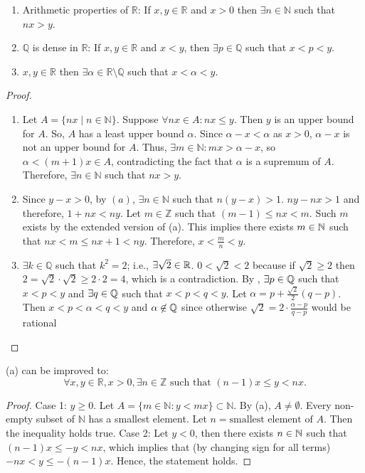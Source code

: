 \begin{theorem}
	\hfill
	\begin{enumerate}[label=(\alph*)]
		\item Arithmetic properties of $\mathbb{R}$:
		      If $x,y \in \mathbb{R}$ and  $x>0$ then $\exists n\in \mathbb{N}$ such that $nx>y$.
		\item $\mathbb{Q}$ is dense in $\mathbb{R}$: If $x,y \in \mathbb{R}$ and $x<y$, then $\exists p \in \mathbb{Q}$ such that $x<p<y$.
		\item $x, y \in \mathbb{R}$ then $\exists \alpha \in \mathbb{R}\setminus \mathbb{Q}$ such that $x<\alpha<y$.
	\end{enumerate}
	\begin{proof}
		\def\currentprefix{arithmetic}
		\begin{enumerate}[label=(\alph*)]
			\item {} Let $A = \{nx \mid n \in \mathbb{N}\}$. Suppose $\forall nx \in A: nx \leq y$. Then $y$ is an upper bound for $A$. So, $A$ has a least upper bound $\alpha$. Since $\alpha - x < \alpha$ as $x>0$, $\alpha -x$  is not an upper bound for $A$. Thus, $\exists m\in \mathbb{N}: mx>\alpha-x$, so $\alpha<(m+1)x\in A$, contradicting the fact that $\alpha$ is a supremum of $A$. Therefore, $\exists n\in \mathbb{N}$ such that $nx>y$.
			\item {}  Since $y-x>0$, by $(a)$, $\exists n\in \mathbb{N}$ such that $n(y-x)>1$. $ny-nx>1$ and therefore, $1+nx<ny$.
			      Let $m\in \mathbb{Z}$ such that $(m-1)\le nx<m$. Such $m$ exists by the extended version of (a).
			      This implies there exists $m \in \mathbb{N} $ such that  $nx<m\le nx+1<ny$. Therefore, $x<\frac{m}{n}<y$.
			\item {} $\exists k\in \mathbb{Q}$ such that $k^2=2$; i.e., $\exists{\sqrt{2} \in \ensuremath{\mathbb{R}}}$.
			      $0<\sqrt{2}<2$ because if $\sqrt{2}\ge 2$ then $2=\sqrt{2}\cdot \sqrt{2}\ge 2\cdot 2= 4$, which is a contradiction.
			      By , $\exists p\in \mathbb{Q} $ such that $x<p<y$ and $\exists q \in \mathbb{Q} $ such that $x<p<q<y$. Let $\alpha=p+\frac{\sqrt{2}}{2}(q-p)$. Then $x<p<\alpha<q<y$ and $\alpha \not\in \mathbb{Q} $ since otherwise $\sqrt{2}=2\cdot \frac{\alpha-p}{q-p}$ would be rational
		\end{enumerate}
	\end{proof}
	\begin{note}
		(a) can be improved to:
		\begin{equation}
			\forall x,y\in \mathbb{R}, x>0, \exists n \in \mathbb{Z} \text{ such that } (n-1)x\le y<nx.
		\end{equation}
		\begin{proof}
			Case 1: $y\ge 0$. Let $A=\{m\in \mathbb{N}:y<mx\}\subset \mathbb{N}$. By (a), $A\neq \emptyset$. Every non-empty subset of $\mathbb{N}$ has a smallest element. Let $n=\text{smallest element of }A$. Then the inequality holds true.
			Case 2: Let $y<0$, then there exists $n\in\mathbb{N}$ such that $(n-1)x\leq-y<nx$, which implies that (by changing sign for all terms) $-nx<y\leq -(n-1)x$. Hence, the statement holds.
		\end{proof}
	\end{note}
\end{theorem}

